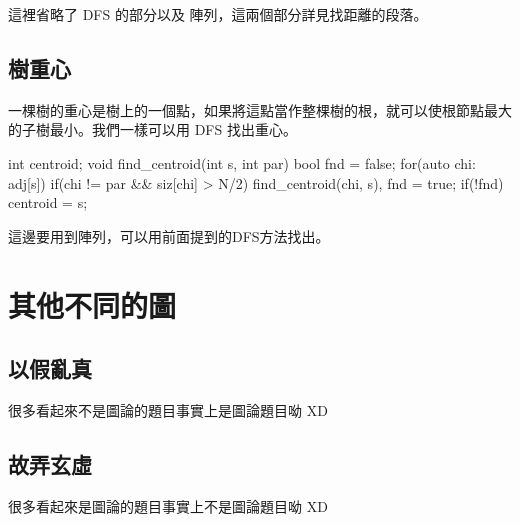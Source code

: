 \documentclass[main.tex]{subfiles}
\begin{document}
這裡省略了 DFS 的部分以及  陣列，這兩個部分詳見找距離的段落。

\subsection{樹重心}
一棵樹的重心是樹上的一個點，如果將這點當作整棵樹的根，就可以使根節點最大的子樹最小。我們一樣可以用 DFS 找出重心。
\begin{C++}
int centroid;
void find_centroid(int s, int par){
    bool fnd = false;
    for(auto chi: adj[s]){
        if(chi != par && siz[chi] > N/2)
            find_centroid(chi, s), fnd = true;
    }
    if(!fnd) centroid = s;
}
\end{C++}
這邊要用到陣列，可以用前面提到的DFS方法找出。

\section{其他不同的圖}

\subsection{以假亂真}

很多看起來不是圖論的題目事實上是圖論題目呦 XD\\



\subsection{故弄玄虛}

很多看起來是圖論的題目事實上不是圖論題目呦 XD\\

\end{document}

